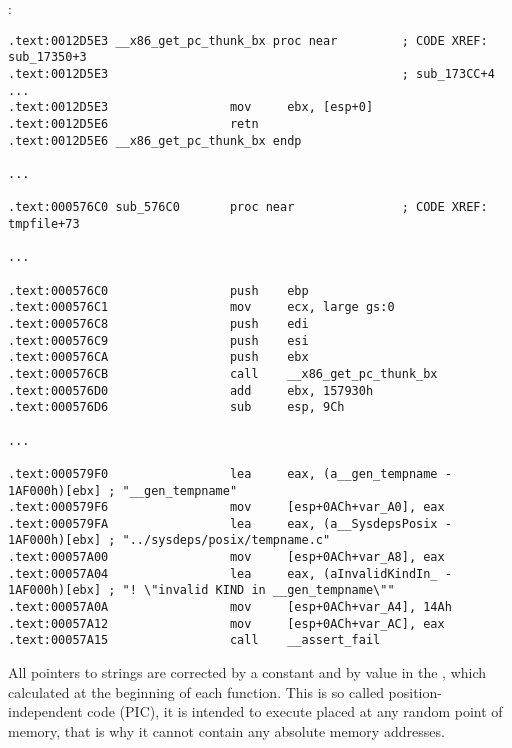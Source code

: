 ﻿\section{\CapitalPICcode}
\index{\PICcode}
\label{sec:PIC}

:

\begin{lstlisting}[caption=libc-2.17.so x86]
.text:0012D5E3 __x86_get_pc_thunk_bx proc near         ; CODE XREF: sub_17350+3
.text:0012D5E3                                         ; sub_173CC+4 ...
.text:0012D5E3                 mov     ebx, [esp+0]
.text:0012D5E6                 retn
.text:0012D5E6 __x86_get_pc_thunk_bx endp

...

.text:000576C0 sub_576C0       proc near               ; CODE XREF: tmpfile+73

...

.text:000576C0                 push    ebp
.text:000576C1                 mov     ecx, large gs:0
.text:000576C8                 push    edi
.text:000576C9                 push    esi
.text:000576CA                 push    ebx
.text:000576CB                 call    __x86_get_pc_thunk_bx
.text:000576D0                 add     ebx, 157930h
.text:000576D6                 sub     esp, 9Ch

...

.text:000579F0                 lea     eax, (a__gen_tempname - 1AF000h)[ebx] ; "__gen_tempname"
.text:000579F6                 mov     [esp+0ACh+var_A0], eax
.text:000579FA                 lea     eax, (a__SysdepsPosix - 1AF000h)[ebx] ; "../sysdeps/posix/tempname.c"
.text:00057A00                 mov     [esp+0ACh+var_A8], eax
.text:00057A04                 lea     eax, (aInvalidKindIn_ - 1AF000h)[ebx] ; "! \"invalid KIND in __gen_tempname\""
.text:00057A0A                 mov     [esp+0ACh+var_A4], 14Ah
.text:00057A12                 mov     [esp+0ACh+var_AC], eax
.text:00057A15                 call    __assert_fail
\end{lstlisting}

{All pointers to strings are corrected by a constant and by value in the \EBX,
which calculated at the beginning of each function.}
{This is so called position-independent code (PIC), it is intended to execute placed at any random point of memory, that is why it cannot contain any absolute memory addresses}.

